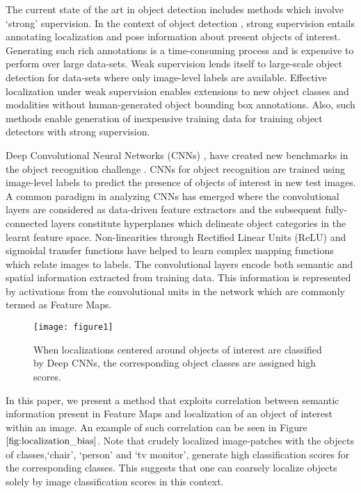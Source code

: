 \documentclass[runningheads]{llncs}
\begin{document}
The current state of the art in object detection includes methods which involve `strong' supervision. In the context of  object detection , strong supervision entails annotating  localization and pose information about present objects of interest. Generating such rich annotations is a time-consuming process and is expensive to perform over large data-sets. Weak supervision lends itself to large-scale object detection for data-sets where only image-level labels are available. Effective localization under weak supervision enables extensions to new object classes and modalities without human-generated object bounding box annotations. Also, such methods enable generation of inexpensive training data for training object detectors with strong supervision.

Deep Convolutional Neural Networks  (CNNs) \cite{szegedy2015going}, \cite{krizhevsky2012imagenet} have created new benchmarks in the object recognition challenge \cite{deng2009imagenet}. CNNs for object recognition are trained using image-level labels to predict the presence of objects of interest in new test images.  A common paradigm in analyzing CNNs has emerged where the convolutional layers are considered as data-driven feature extractors and the subsequent fully-connected layers constitute hyperplanes which delineate object categories in the learnt feature space. Non-linearities through Rectified Linear Units (ReLU) and sigmoidal transfer functions have helped to learn complex mapping functions which relate images to labels.  The convolutional layers encode both semantic and spatial information extracted from training data. This information is represented by  activations from the convolutional units in the network which are commonly termed as Feature Maps.

\begin{figure}
\begin{center}
\texttt{[image: figure1]}
\end{center}
   \caption{When localizations centered around objects of interest are classified by Deep CNNs, the corresponding object classes are assigned high scores.}
\label{fig:localization_bias}
\end{figure}

In this paper, we present a method that exploits  correlation between semantic information present in Feature Maps and  localization of an object of interest within an  image. An example of such correlation can be seen in Figure $\ref{fig:localization_bias}$. Note that crudely localized image-patches with the objects of classes,`chair', `person' and `tv monitor', generate high classification scores for the corresponding classes. This suggests that one can coarsely localize objects solely by image classification scores in this context.
\end{document}
